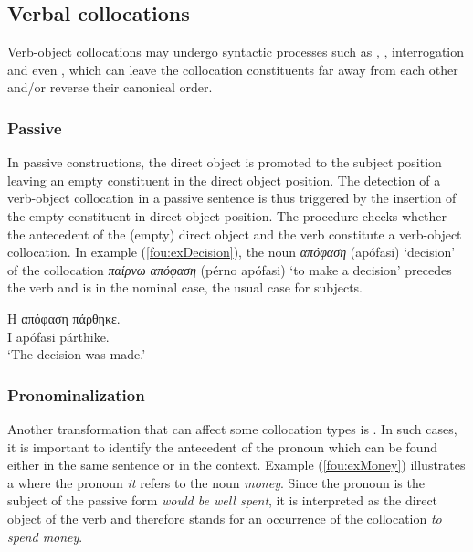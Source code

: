 \documentclass[output=paper]{langsci/langscibook}
\begin{document}
\subsection{Verbal collocations}
Verb-object collocations may undergo syntactic processes such as , , interrogation and even , which can leave the collocation constituents far away from each other and/or reverse their canonical order.



\subsubsection{Passive}
In passive constructions, the direct object is promoted to the subject position leaving an empty constituent in the direct object position. The detection of a verb-object collocation in a passive sentence is thus triggered by the insertion of the empty constituent in direct object position. The  procedure checks whether the antecedent of the (empty) direct object and the verb constitute a verb-object collocation.
In example (\ref{fou:exDecision}), %
the noun  \textit{απόφαση} (apófasi) `decision' of the collocation \textit{παίρνω απόφαση} (pérno apófasi) `to make a decision'  precedes the verb and is in the nominal case, the usual case for subjects.

\ea\label{fou:exDecision}
\gll Η απόφαση πάρθηκε. \\
I apófasi párthike. \\
\glt `The decision was made.'
\z

\subsubsection{Pronominalization}
Another transformation that can affect some collocation types is .  In such cases, it is important to identify the antecedent of the pronoun which can be found either in the same sentence or in the context. Example (\ref{fou:exMoney}) %
illustrates a  where the pronoun \textit{it} refers to the noun \textit{money}. Since the pronoun is the subject of the passive form \textit{would be well spent}, it is interpreted as the direct object of the verb and therefore stands for an occurrence of the collocation \textit{to spend money}.
\end{document}
